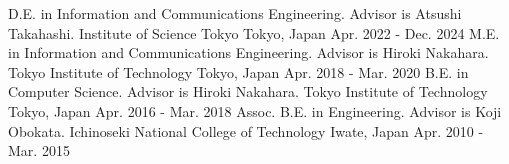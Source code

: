 \begin{cventries}
  \eduentry
    {D.E. in Information and Communications Engineering. Advisor is Atsushi Takahashi.} %
    {Institute of Science Tokyo} %
    {Tokyo, Japan} %
    {Apr. 2022 - Dec. 2024} %
  \eduentry
    {M.E. in Information and Communications Engineering. Advisor is Hiroki Nakahara.} %
    {Tokyo Institute of Technology} %
    {Tokyo, Japan} %
    {Apr. 2018 - Mar. 2020} %
  \eduentry
    {B.E. in Computer Science. Advisor is Hiroki Nakahara.} %
    {Tokyo Institute of Technology} %
    {Tokyo, Japan} %
    {Apr. 2016 - Mar. 2018} %
  \eduentry
    {Assoc. B.E. in Engineering. Advisor is Koji Obokata.} %
    {Ichinoseki National College of Technology} %
    {Iwate, Japan} %
    {Apr. 2010 - Mar. 2015} %
\end{cventries}
